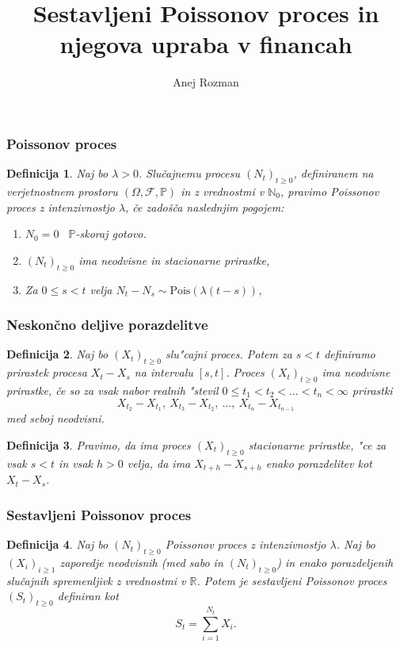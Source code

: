 \documentclass[]{beamer} %
\title[CPP in njegova uporaba v financah]{Sestavljeni Poissonov proces in njegova upraba v financah}
\subtitle{}
\author[Anej Rozman]{Anej Rozman}
\institute[]{Mentor: doc.~dr. Martin Raič}
\date[]{}
\theoremstyle{plain}
\newtheorem{definicija}{Definicija}
\newcommand{\Prob}{\mathbb{P}}
\newcommand{\1}{\mathds{1}}
\newcommand{\Pois}[1]{\text{Pois}(#1)}
\begin{document}
\frame{\titlepage}

\begin{frame}
  \frametitle{Poissonov proces}
  \begin{definicija}
    Naj bo $\lambda > 0$. Slučajnemu procesu $(N_t)_{t\geq 0}$, definiranem na verjetnostnem 
    prostoru $(\Omega, \mathcal{F}, \mathbb{P})$ in z vrednostmi v $\mathbb{N}_0$, pravimo 
    \textit{Poissonov proces} z intenzivnostjo $\lambda$, če zadošča naslednjim pogojem:
    \begin{enumerate}
        \item $N_0 = 0$ \ $\Prob$-skoraj gotovo.
        \item $(N_t)_{t\geq 0}$ ima neodvisne in stacionarne prirastke,
        \item Za $0 \leq s < t$ velja $ N_t - N_s \sim\Pois{\lambda(t - s)}$,
    \end{enumerate}
  \end{definicija}
\end{frame}

\begin{frame}
  \frametitle{Neskončno deljive porazdelitve}
  \begin{definicija}
    Naj bo $(X_t)_{t\geq0}$ slu"cajni proces. Potem za $s < t$ definiramo
    \textit{prirastek procesa} $X_t - X_s$ na intervalu $[s, t]$. Proces $(X_t)_{t\geq0}$ ima 
    \textit{neodvisne prirastke}, če so za vsak nabor realnih "stevil
    $0 \leq t_1 < t_2 < \ldots < t_n < \infty$ prirastki
    $$
        X_{t_2} - X_{t_1}, \ X_{t_3} - X_{t_2}, \ \ldots, \ X_{t_n} - X_{t_{n-1}}
    $$
    med seboj neodvisni.
    \label{def:prirastek}
    \end{definicija}
    \pause
    \begin{definicija}
    Pravimo, da ima proces $(X_t)_{t\geq0}$
    \textit{stacionarne prirastke}, "ce za vsak $s < t$ in vsak $h > 0$ velja, 
    da ima $X_{t+h} - X_{s+h}$ enako porazdelitev kot $X_t - X_s$.
    \label{def:stacPrir}
    \end{definicija}

  \end{frame}

\begin{frame}
  \frametitle{Sestavljeni Poissonov proces}
  \begin{definicija}
    Naj bo $(N_t)_{t\geq0}$ Poissonov proces z intenzivnostjo $\lambda$. 
    Naj bo $(X_i)_{i\geq1}$ zaporedje neodvisnih (med sabo in $(N_t)_{t\geq0}$) in enako 
    porazdeljenih slučajnih spremenljivk z vrednostmi v $\mathbb{R}$. Potem je 
    \textit{sestavljeni Poissonov proces} $(S_t)_{t\geq0}$ definiran kot
    $$
        S_t = \sum_{i=1}^{N_t} X_i.
    $$
    \label{def:CPP}
\end{definicija}

\end{frame}
\end{document}
